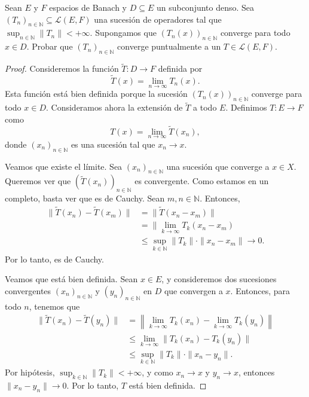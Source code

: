 \begin{exercise}
    Sean $E$ y $F$ espacios de Banach y $D \subseteq E$ un subconjunto denso. Sea $(T_n)_{n \in \mathbb{N}} \subseteq \mathcal{L}(E, F)$ una sucesión de operadores tal que $\sup_{n \in \mathbb{N}} \| T_n \| < +\infty$. Supongamos que $(T_n(x))_{n \in \mathbb{N}}$ converge para todo $x \in D$. Probar que $(T_n)_{n \in \mathbb{N}}$ converge puntualmente a un $T \in \mathcal{L}(E, F)$.
\end{exercise}

\begin{proof}
    Consideremos la función $\widetilde{T} : D \to F$ definida por
    \begin{equation*}
        \widetilde{T}(x) = \lim_{n \to \infty} T_n(x).
    \end{equation*}
    Esta función está bien definida porque la sucesión $(T_n(x))_{n \in \mathbb{N}}$ converge para todo $x \in D$. Consideramos ahora la extensión de $\widetilde{T}$ a todo $E$. Definimos $T : E \to F$ como
    \begin{equation*}
        T(x) = \lim_{n \to \infty} \widetilde{T}(x_n),
    \end{equation*}
    donde $(x_n)_{n \in \mathbb{N}}$ es una sucesión tal que $x_n \to x$. 

    Veamos que existe el límite. Sea $(x_n)_{n \in \mathbb{N}}$ una sucesión que converge a $x \in X$. Queremos ver que $(\widetilde{T}(x_n))_{n \in \mathbb{N}}$ es convergente. Como estamos en un completo, basta ver que es de Cauchy. Sean $m, n \in \mathbb{N}$. Entonces,
    \begin{align*}
        \| \widetilde{T}(x_n) - \widetilde{T}(x_m) \|  &= \| \widetilde{T}(x_n - x_m) \| \\
        &= \| \lim_{k \to \infty} T_k (x_n - x_m) \\
        &\leq \sup_{k \in \mathbb{N}} \| T_k \| \cdot \| x_n - x_m \| \longrightarrow 0.
    \end{align*}
    Por lo tanto, es de Cauchy.
    
    Veamos que está bien definida. Sean $x \in E$, y consideremos dos sucesiones convergentes $(x_n)_{n \in \mathbb{N}}$ y $(y_n)_{n \in \mathbb{N}}$ en $D$ que convergen a $x$. Entonces, para todo $n$, tenemos que
    \begin{align*}
        \| \widetilde{T}(x_n) - \widetilde{T}(y_n) \| &= \left\| \lim_{k \to \infty} T_k(x_n) - \lim_{k \to \infty} T_k(y_n) \right\| \\
        &\leq \lim_{k \to \infty} \| T_k(x_n) - T_k(y_n) \| \\
        &\leq \sup_{k \in \mathbb{N}} \| T_k \| \cdot \| x_n - y_n \|.
    \end{align*}
    Por hipótesis, $\sup_{k \in \mathbb{N}} \| T_k \| < +\infty$, y como $x_n \to x$ y $y_n \to x$, entonces $\| x_n - y_n \| \to 0$. Por lo tanto, $T$ está bien definida.


\end{proof}

